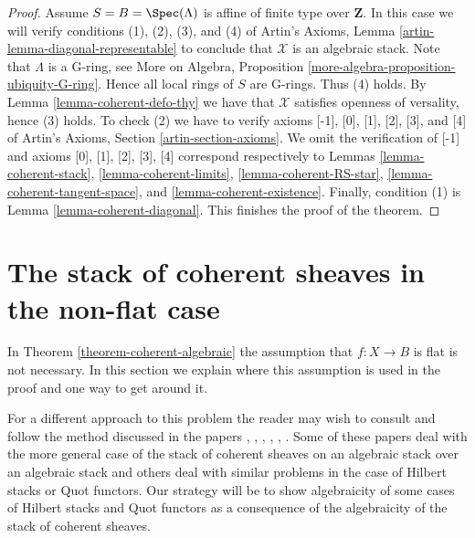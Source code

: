 \begin{proof}
\medskip\noindent
Assume $S = B = \Spec(\Lambda)$ is affine of finite type over $\mathbf{Z}$.
In this case we will verify conditions (1), (2), (3), and (4) of
Artin's Axioms, Lemma \ref{artin-lemma-diagonal-representable}
to conclude that $\mathcal{X}$ is an algebraic stack.
Note that $\Lambda$ is a G-ring, see
More on Algebra, Proposition \ref{more-algebra-proposition-ubiquity-G-ring}.
Hence all local rings of $S$ are G-rings. Thus (4) holds.
By Lemma \ref{lemma-coherent-defo-thy}
we have that $\mathcal{X}$ satisfies openness of versality, hence (3) holds.
To check (2) we have to verify axioms [-1], [0], [1], [2], [3], and [4]
of Artin's Axioms, Section \ref{artin-section-axioms}.
We omit the verification of [-1] and axioms
[0], [1], [2], [3], [4] correspond respectively to
Lemmas \ref{lemma-coherent-stack},
\ref{lemma-coherent-limits},
\ref{lemma-coherent-RS-star},
\ref{lemma-coherent-tangent-space}, and
\ref{lemma-coherent-existence}.
Finally, condition (1) is Lemma \ref{lemma-coherent-diagonal}.
This finishes the proof of the theorem.
\end{proof}








\section{The stack of coherent sheaves in the non-flat case}
\label{section-not-flat}

\noindent
In Theorem \ref{theorem-coherent-algebraic} the assumption that $f : X \to B$
is flat is not necessary. In this section we explain where this assumption is
used in the proof and one way to get around it.

\medskip\noindent
For a different approach to this problem the reader may wish to consult
\cite{ArtinI} and follow the method discussed in the papers
\cite{olsson-starr}, \cite{lieblich_remarks}, \cite{olsson_proper},
\cite{Hall-Rydh}, \cite{Hall-Rydh-Hilbert}, \cite{rydh_representability}.
Some of these papers deal with the more general case of the stack of
coherent sheaves on an algebraic stack over an algebraic stack and
others deal with similar problems in the case of Hilbert stacks
or Quot functors. Our strategy will be to show algebraicity of some
cases of Hilbert stacks and Quot functors as a consequence of the
algebraicity of the stack of coherent sheaves.

